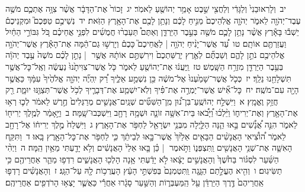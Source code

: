 \documentclass[18pt]{article}
\newcommand{\vart}[1]{\Bfootnote{#1}}	%
\begin{document}
 {\loc יב~}וְלָרֽאוּבֵנִי֙ וְלַגָּדִ֔י וְלַחֲצִ֖י שֵׁ֣בֶט  \edtext{הַֽמְנַשֶּׁ֑ה}{\vart{א=הַֽמֲנַשֶּׁ֑ה | }}  אָמַ֥ר יְהוֹשֻׁ֖עַ לֵאמֹֽר׃ \startlock
 {\loc יג~}זָכוֹר֙ אֶת־הַדָּבָ֔ר אֲשֶׁ֨ר צִוָּ֥ה אֶתְכֶ֛ם מֹשֶׁ֥ה עֶבֶד־יְהֹוָ֖ה לֵאמֹ֑ר יְהֹוָ֤ה אֱלֹֽהֵיכֶם֙ מֵנִ֣יחַ לָכֶ֔ם וְנָתַ֥ן לָכֶ֖ם אֶת־הָאָ֥רֶץ הַזֹּֽאת׃ \startlock
 {\loc יד~}נְשֵׁיכֶ֣ם טַפְּכֶם֮ וּמִקְנֵיכֶם֒ יֵשְׁב֕וּ בָּאָ֕רֶץ אֲשֶׁ֨ר נָתַ֥ן לָכֶ֛ם מֹשֶׁ֖ה בְּעֵ֣בֶר הַיַּרְדֵּ֑ן וְאַתֶּם֩ תַּעַבְר֨וּ חֲמֻשִׁ֜ים לִפְנֵ֣י אֲחֵיכֶ֗ם כֹּ֚ל גִּבּוֹרֵ֣י הַחַ֔יִל וַעֲזַרְתֶּ֖ם אוֹתָֽם׃ \startlock
 {\loc טו~}עַ֠ד אֲשֶׁר־יָנִ֨יחַ יְהֹוָ֥ה  |  לַאֲחֵיכֶם֮ כָּכֶם֒ וְיָרְשׁ֣וּ גַם־הֵ֔מָּה אֶת־הָאָ֕רֶץ אֲשֶׁר־יְהֹוָ֥ה אֱלֹהֵיכֶ֖ם נֹתֵ֣ן לָהֶ֑ם וְשַׁבְתֶּ֞ם לְאֶ֤רֶץ יְרֻשַּׁתְכֶם֙ וִירִשְׁתֶּ֣ם אוֹתָ֔הּ אֲשֶׁ֣ר  |  נָתַ֣ן לָכֶ֗ם מֹשֶׁה֙ עֶ֣בֶד יְהֹוָ֔ה בְּעֵ֥בֶר הַיַּרְדֵּ֖ן מִזְרַ֥ח הַשָּֽׁמֶשׁ׃ \startlock
 {\loc טז~}וַֽיַּעֲנ֔וּ אֶת־יְהוֹשֻׁ֖עַ לֵאמֹ֑ר כֹּ֤ל אֲשֶׁר־צִוִּיתָ֙נוּ֙ נַעֲשֶׂ֔ה וְאֶֽל־כׇּל־אֲשֶׁ֥ר תִּשְׁלָחֵ֖נוּ נֵלֵֽךְ׃ \startlock
 {\loc יז~}כְּכֹ֤ל אֲשֶׁר־שָׁמַ֙עְנוּ֙ אֶל־מֹשֶׁ֔ה כֵּ֖ן נִשְׁמַ֣ע אֵלֶ֑יךָ רַ֠ק יִֽהְיֶ֞ה יְהֹוָ֤ה אֱלֹהֶ֙יךָ֙ עִמָּ֔ךְ כַּאֲשֶׁ֥ר הָיָ֖ה עִם־מֹשֶֽׁה׃ \startlock
 {\loc יח~}כׇּל־אִ֞ישׁ אֲשֶׁר־יַמְרֶ֣ה אֶת־פִּ֗יךָ וְלֹֽא־יִשְׁמַ֧ע אֶת־דְּבָרֶ֛יךָ לְכֹ֥ל אֲשֶׁר־תְּצַוֶּ֖נּוּ יוּמָ֑ת רַ֖ק חֲזַ֥ק וֶאֱמָֽץ׃ 
\startlock
 {\loc א~}וַיִּשְׁלַ֣ח יְהוֹשֻֽׁעַ־בִּן־נ֠וּן מִֽן־הַשִּׁטִּ֞ים שְׁנַֽיִם־אֲנָשִׁ֤ים מְרַגְּלִים֙ חֶ֣רֶשׁ לֵאמֹ֔ר לְכ֛וּ רְא֥וּ אֶת־הָאָ֖רֶץ וְאֶת־יְרִיח֑וֹ וַיֵּ֨לְכ֜וּ וַ֠יָּבֹ֠אוּ בֵּית־אִשָּׁ֥ה זוֹנָ֛ה וּשְׁמָ֥הּ רָחָ֖ב וַיִּשְׁכְּבוּ־שָֽׁמָּה׃ \startlock
 {\loc ב~}וַיֵּ֣אָמַ֔ר לְמֶ֥לֶךְ יְרִיח֖וֹ לֵאמֹ֑ר הִנֵּ֣ה אֲ֠נָשִׁ֠ים בָּ֣אוּ הֵ֧נָּה הַלַּ֛יְלָה מִבְּנֵ֥י יִשְׂרָאֵ֖ל לַחְפֹּ֥ר אֶת־הָאָֽרֶץ׃ \startlock
 {\loc ג~}וַיִּשְׁלַח֙ מֶ֣לֶךְ יְרִיח֔וֹ אֶל־רָחָ֖ב לֵאמֹ֑ר ה֠וֹצִ֠יאִי הָאֲנָשִׁ֨ים הַבָּאִ֤ים אֵלַ֙יִךְ֙ אֲשֶׁר־בָּ֣אוּ לְבֵיתֵ֔ךְ כִּ֛י לַחְפֹּ֥ר אֶת־כׇּל־הָאָ֖רֶץ בָּֽאוּ׃ \startlock
 {\loc ד~}וַתִּקַּ֧ח הָאִשָּׁ֛ה אֶת־שְׁנֵ֥י הָאֲנָשִׁ֖ים וַֽתִּצְפְּנ֑וֹ וַתֹּ֣אמֶר  |  כֵּ֗ן בָּ֤אוּ אֵלַי֙ הָאֲנָשִׁ֔ים וְלֹ֥א יָדַ֖עְתִּי מֵאַ֥יִן הֵֽמָּה׃ \startlock
 {\loc ה~}וַיְהִ֨י הַשַּׁ֜עַר לִסְגּ֗וֹר בַּחֹ֙שֶׁךְ֙ וְהָאֲנָשִׁ֣ים יָצָ֔אוּ לֹ֣א יָדַ֔עְתִּי אָ֥נָה הָלְכ֖וּ הָאֲנָשִׁ֑ים רִדְפ֥וּ מַהֵ֛ר אַחֲרֵיהֶ֖ם כִּ֥י תַשִּׂיגֽוּם׃ \startlock
 {\loc ו~}וְהִ֖יא הֶעֱלָ֣תַם הַגָּ֑גָה וַֽתִּטְמְנֵם֙ בְּפִשְׁתֵּ֣י הָעֵ֔ץ הָעֲרֻכ֥וֹת לָ֖הּ עַל־הַגָּֽג׃ \startlock
 {\loc ז~}וְהָאֲנָשִׁ֗ים רָדְפ֤וּ אַֽחֲרֵיהֶם֙ דֶּ֣רֶךְ הַיַּרְדֵּ֔ן עַ֖ל הַֽמַּעְבְּר֑וֹת וְהַשַּׁ֣עַר סָגָ֔רוּ אַחֲרֵ֕י כַּאֲשֶׁ֛ר יָצְא֥וּ הָרֹדְפִ֖ים אַחֲרֵיהֶֽם׃ \startlock
\end{document}
